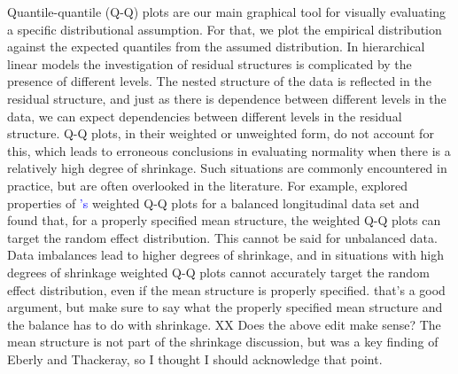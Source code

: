 \documentclass[12pt]{article} %
\newcommand{\citetapos}[1]{\citeauthor{#1}{\textcolor{blue}{'s}} }
\newcommand{\hh}[1]{{\color{orange} #1}}
\newcommand{\al}[1]{{\color{red} #1}}
\begin{document}
Quantile-quantile (Q-Q) plots \citep{Wilk:1968} are our main graphical tool for  \hh{visually} evaluating a specific distributional assumption. For that, we plot the empirical distribution against the expected quantiles from the assumed distribution. 
In hierarchical linear models the investigation of residual structures is complicated by the presence of  different levels. 
The nested structure of the data is reflected in the residual structure, and just as there is dependence between different levels in the data, we can expect dependencies between different levels in the residual structure. 
Q-Q plots, in their weighted \citep{Dempster:1985tr, Lange:1989uu} or unweighted {form}, do not account for this, which \al{leads to} erroneous conclusions in evaluating normality when there is a relatively high degree of shrinkage. Such situations are commonly encountered in practice, but are often overlooked in the literature. For example, \cite{Eberly:2005ee} explored properties of \citetapos{Lange:1989uu} weighted Q-Q plots for a balanced longitudinal data set and found that, for a properly specified mean structure, the weighted Q-Q plots can target the random effect distribution. \al{This cannot be said for unbalanced data. Data imbalances lead to higher degrees of shrinkage, and in situations with high degrees of shrinkage weighted Q-Q plots  cannot accurately target the random effect distribution, even if the mean structure is properly specified.}
\hh{that's a good argument, but make sure to say what the properly specified mean structure and the balance has to do with shrinkage.} \al{XX Does the above edit make sense? The mean structure is not part of the shrinkage discussion, but was a key finding of Eberly and Thackeray, so I thought I should acknowledge that point.}



\end{document}
